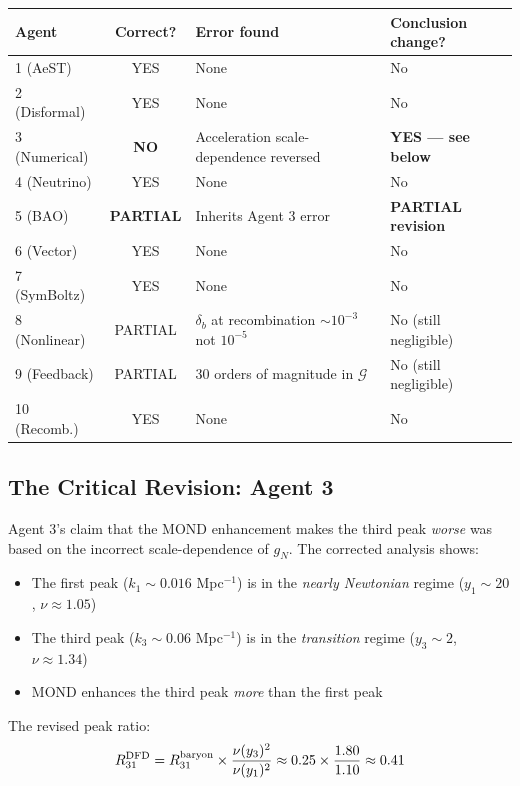 \documentclass[11pt,a4paper]{article}
\begin{document}
\begin{center}
\begin{tabular}{lcll}
\toprule
\textbf{Agent} & \textbf{Correct?} & \textbf{Error found} & \textbf{Conclusion change?} \\
\midrule
1 (AeST) & YES & None & No \\
2 (Disformal) & YES & None & No \\
3 (Numerical) & \textbf{NO} & Acceleration scale-dependence reversed & \textbf{YES --- see below} \\
4 (Neutrino) & YES & None & No \\
5 (BAO) & \textbf{PARTIAL} & Inherits Agent 3 error & \textbf{PARTIAL revision} \\
6 (Vector) & YES & None & No \\
7 (SymBoltz) & YES & None & No \\
8 (Nonlinear) & PARTIAL & $\delta_b$ at recombination $\sim 10^{-3}$ not $10^{-5}$ & No (still negligible) \\
9 (Feedback) & PARTIAL & 30 orders of magnitude in $\mathcal{G}$ & No (still negligible) \\
10 (Recomb.) & YES & None & No \\
\bottomrule
\end{tabular}
\end{center}

\subsection{The Critical Revision: Agent 3}

Agent 3's claim that the MOND enhancement makes the third peak \emph{worse} was based on the incorrect scale-dependence of $g_N$. The corrected analysis shows:

\begin{itemize}
\item The first peak ($k_1 \sim 0.016$ Mpc$^{-1}$) is in the \emph{nearly Newtonian} regime ($y_1 \sim 20$, $\nu \approx 1.05$)
\item The third peak ($k_3 \sim 0.06$ Mpc$^{-1}$) is in the \emph{transition} regime ($y_3 \sim 2$, $\nu \approx 1.34$)
\item MOND enhances the third peak \emph{more} than the first peak
\end{itemize}

The revised peak ratio:
\begin{equation}
R_{31}^{\rm DFD} = R_{31}^{\rm baryon} \times \frac{\nu(y_3)^2}{\nu(y_1)^2} \approx 0.25 \times \frac{1.80}{1.10} \approx 0.41
\end{equation}
\end{document}
